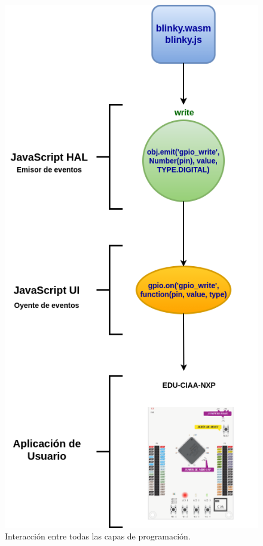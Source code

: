 \begin{figure}[ht]
	\centering
	\includegraphics[scale=.36]{./Figures/AplicacionUsuarioLeds.png}
	\caption{Interacción entre todas las capas de programación.}
	\label{fig:AplicacionUsuarioLeds}
\end{figure}



